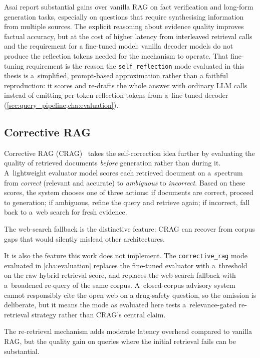 Asai \etal report substantial gains over vanilla RAG on fact verification and
long-form generation tasks, especially on questions that require synthesising
information from multiple sources.
The explicit reasoning about evidence quality improves factual accuracy, but at the
cost of higher latency from interleaved retrieval calls and the requirement for a
fine-tuned model: vanilla decoder models do not produce the reflection tokens
needed for the mechanism to operate.
That fine-tuning requirement is the reason the \texttt{self\_reflection} mode
evaluated in this thesis is a~simplified, prompt-based approximation rather than a
faithful reproduction: it scores and re-drafts the whole answer with ordinary LLM
calls instead of emitting per-token reflection tokens from a~fine-tuned decoder
(\cref{sec:query_pipeline,cha:evaluation}).

\subsection{Corrective RAG}
\label{subsec:corrective_rag}

Corrective RAG (CRAG)~\cite{yan2024crag} takes the self-correction idea further by
evaluating the quality of retrieved documents \emph{before} generation rather than
during it.
A~lightweight evaluator model scores each retrieved document on a~spectrum from
\emph{correct} (relevant and accurate) to \emph{ambiguous} to \emph{incorrect}.
Based on these scores, the system chooses one of three actions:
if documents are correct, proceed to generation;
if ambiguous, refine the query and retrieve again;
if incorrect, fall back to a~web search for fresh evidence.

The web-search fallback is the distinctive feature: CRAG can recover from corpus
gaps that would silently mislead other architectures.

It is also the feature this work does not implement.
The \texttt{corrective\_rag} mode evaluated in \cref{cha:evaluation} replaces the
fine-tuned evaluator with a~threshold on the raw hybrid retrieval score, and
replaces the web-search fallback with a~broadened re-query of the same corpus.
A~closed-corpus advisory system cannot responsibly cite the open web on a
drug-safety question, so the omission is deliberate, but it means the mode as
evaluated here tests a~relevance-gated re-retrieval strategy rather than CRAG's
central claim.

The re-retrieval mechanism adds moderate latency overhead compared to vanilla RAG,
but the quality gain on queries where the initial retrieval fails can be substantial.

